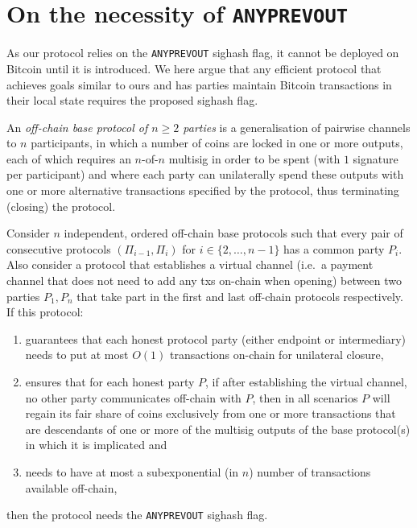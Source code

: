 \section{On the necessity of \texttt{ANYPREVOUT}}
  \label{section:anyprevout}
  As our protocol relies on the \texttt{ANYPREVOUT} sighash flag, it cannot be
  deployed on Bitcoin until it is introduced. We here argue that any efficient
  protocol that achieves goals similar to ours and has parties maintain 
  Bitcoin transactions in their local state requires  the proposed sighash flag. 

  \begin{definition}
    An \emph{off-chain base protocol of $n \geq 2$ parties} is a generalisation
    of pairwise channels to $n$ participants, in which a number of coins are
    locked in one or more outputs, each of which requires an $n$-of-$n$ multisig
    in order to be spent (with $1$ signature per participant) and where each
    party can unilaterally spend these outputs with one or more alternative
    transactions specified by the protocol, thus terminating (closing) the
    protocol.
  \end{definition}

  \begin{theorem}
    \label{theorem:anyprevout}
    Consider $n$ independent, ordered off-chain base protocols
    such that every pair of consecutive protocols $(\Pi_{i-1}, \Pi_i)$ for $i
    \in \{2, \dots, n-1\}$ has a common party $P_i$. Also consider a protocol
    that establishes a virtual channel (i.e.\ a payment channel that does not
    need to add any txs on-chain when opening) between two parties $P_1, P_n$
    that take part in the first and last off-chain protocols respectively. If
    this protocol:
    \begin{enumerate}
    \item guarantees that each honest protocol party (either endpoint or
    intermediary) needs to put at most $O(1)$ transactions on-chain for
    unilateral closure,
    \item ensures that for each honest party $P$, if after establishing the
    virtual channel, no other party communicates off-chain with $P$, then in all
    scenarios $P$ will regain its fair share of coins exclusively from one or
    more transactions that are descendants of one or more of the multisig
    outputs of the base protocol(s) in which it is implicated and
    \item needs to have at most a subexponential (in $n$) number of transactions
    available off-chain,
    \end{enumerate}
    then the protocol needs the \texttt{ANYPREVOUT} sighash flag.
  \end{theorem}

